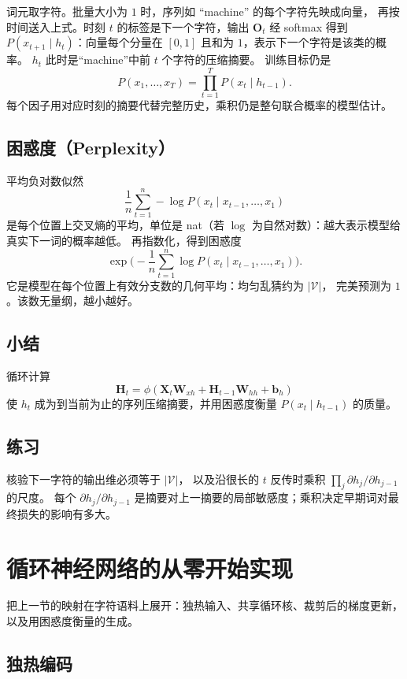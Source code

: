 词元取字符。批量大小为 $1$ 时，序列如 ``machine'' 的每个字符先映成向量，
再按时间送入上式。时刻 $t$ 的标签是下一个字符，输出 $\bm{O}_t$ 经 softmax
得到 $P(x_{t+1}\mid h_t)$：向量每个分量在 $[0,1]$ 且和为 $1$，表示下一个字符是该类的概率。
$h_t$ 此时是“machine”中前 $t$ 个字符的压缩摘要。
训练目标仍是
\[
P(x_1,\ldots,x_T)=\prod_{t=1}^{T}P(x_t \mid h_{t-1}).
\]
每个因子用对应时刻的摘要代替完整历史，乘积仍是整句联合概率的模型估计。

\subsection{困惑度（Perplexity）}

平均负对数似然
\[
\frac{1}{n}\sum_{t=1}^{n}-\log P(x_t \mid x_{t-1},\ldots,x_1)
\]
是每个位置上交叉熵的平均，单位是 nat（若 $\log$ 为自然对数）：越大表示模型给真实下一词的概率越低。
再指数化，得到困惑度
\[
\exp\Biggl(-\frac{1}{n}\sum_{t=1}^{n}\log P(x_t \mid x_{t-1},\ldots,x_1)\Biggr).
\]
它是模型在每个位置上有效分支数的几何平均：均匀乱猜约为 $|\mathcal{V}|$，
完美预测为 $1$。该数无量纲，越小越好。

\subsection{小结}

循环计算
\[
\bm{H}_t=\phi(\bm{X}_t\bm{W}_{xh}+\bm{H}_{t-1}\bm{W}_{hh}+\bm{b}_h)
\]
使 $h_t$ 成为到当前为止的序列压缩摘要，并用困惑度衡量 $P(x_t\mid h_{t-1})$ 的质量。

\subsection{练习}

核验下一字符的输出维必须等于 $|\mathcal{V}|$，
以及沿很长的 $t$ 反传时乘积 $\prod_j\partial h_j/\partial h_{j-1}$ 的尺度。
每个 $\partial h_j/\partial h_{j-1}$ 是摘要对上一摘要的局部敏感度；乘积决定早期词对最终损失的影响有多大。

\section{循环神经网络的从零开始实现}

把上一节的映射在字符语料上展开：独热输入、共享循环核、裁剪后的梯度更新，
以及用困惑度衡量的生成。

\subsection{独热编码}

